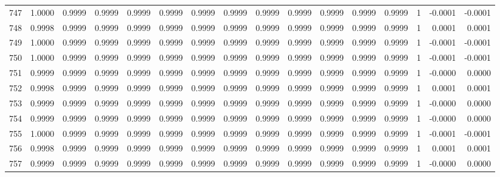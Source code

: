 \begin{tabular}{lrrrrrrrrrrrrrrr}
747 &      1.0000 &  0.9999 &  0.9999 &  0.9999 &  0.9999 &  0.9999 &  0.9999 &  0.9999 &  0.9999 &  0.9999 &   0.9999 &     0.9999 &      1 &                   -0.0001 &                    -0.0001 \\
748 &      0.9998 &  0.9999 &  0.9999 &  0.9999 &  0.9999 &  0.9999 &  0.9999 &  0.9999 &  0.9999 &  0.9999 &   0.9999 &     0.9999 &      1 &                    0.0001 &                     0.0001 \\
749 &      1.0000 &  0.9999 &  0.9999 &  0.9999 &  0.9999 &  0.9999 &  0.9999 &  0.9999 &  0.9999 &  0.9999 &   0.9999 &     0.9999 &      1 &                   -0.0001 &                    -0.0001 \\
750 &      1.0000 &  0.9999 &  0.9999 &  0.9999 &  0.9999 &  0.9999 &  0.9999 &  0.9999 &  0.9999 &  0.9999 &   0.9999 &     0.9999 &      1 &                   -0.0001 &                    -0.0001 \\
751 &      0.9999 &  0.9999 &  0.9999 &  0.9999 &  0.9999 &  0.9999 &  0.9999 &  0.9999 &  0.9999 &  0.9999 &   0.9999 &     0.9999 &      1 &                   -0.0000 &                     0.0000 \\
752 &      0.9998 &  0.9999 &  0.9999 &  0.9999 &  0.9999 &  0.9999 &  0.9999 &  0.9999 &  0.9999 &  0.9999 &   0.9999 &     0.9999 &      1 &                    0.0001 &                     0.0001 \\
753 &      0.9999 &  0.9999 &  0.9999 &  0.9999 &  0.9999 &  0.9999 &  0.9999 &  0.9999 &  0.9999 &  0.9999 &   0.9999 &     0.9999 &      1 &                   -0.0000 &                     0.0000 \\
754 &      0.9999 &  0.9999 &  0.9999 &  0.9999 &  0.9999 &  0.9999 &  0.9999 &  0.9999 &  0.9999 &  0.9999 &   0.9999 &     0.9999 &      1 &                   -0.0000 &                     0.0000 \\
755 &      1.0000 &  0.9999 &  0.9999 &  0.9999 &  0.9999 &  0.9999 &  0.9999 &  0.9999 &  0.9999 &  0.9999 &   0.9999 &     0.9999 &      1 &                   -0.0001 &                    -0.0001 \\
756 &      0.9998 &  0.9999 &  0.9999 &  0.9999 &  0.9999 &  0.9999 &  0.9999 &  0.9999 &  0.9999 &  0.9999 &   0.9999 &     0.9999 &      1 &                    0.0001 &                     0.0001 \\
757 &      0.9999 &  0.9999 &  0.9999 &  0.9999 &  0.9999 &  0.9999 &  0.9999 &  0.9999 &  0.9999 &  0.9999 &   0.9999 &     0.9999 &      1 &                   -0.0000 &                     0.0000 \\

\end{tabular}

